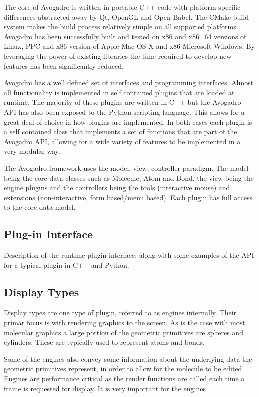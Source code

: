 \documentclass{article}
\begin{document}
The core of Avogadro is written in portable C++ code with platform specific differences abstracted away by Qt, OpenGL and Open Babel. The CMake build system makes the build process relatively simple on all supported platforms. Avogadro has been successfully built and tested on x86 and x86\_64 versions of Linux, PPC and x86 version of Apple Mac OS X and x86 Microsoft Windows. By leveraging the power of existing libraries the time required to develop new features has been significantly reduced.

Avogadro has a well defined set of interfaces and programming interfaces. Almost all functionality is implemented in self contained plugins that are loaded at runtime. The majority of these plugins are written in C++ but the Avogadro API has also been exposed to the Python scripting language. This allows for a great deal of choice in how plugins are implemented. In both cases each plugin is a self contained class that implements a set of functions that are part of the Avogadro API, allowing for a wide variety of features to be implemented in a very modular way.

The Avogadro framework uses the model, view, controller paradigm. The model being the core data classes such as Molecule, Atom and Bond, the view being the engine plugins and the controllers being the tools (interactive mouse) and extensions (non-interactive, form based/menu based). Each plugin has full access to the core data model.

\subsection{Plug-in Interface}

Description of the runtime plugin interface, along with some examples of the API for a typical plugin in C++ and Python.

\subsection{Display Types}

Display types are one type of plugin, referred to as engines internally. Their primar focus is with rendering graphics to the screen. As is the case with most molecular graphics a large portion of the geometric primitives are spheres and cylinders. These are typically used to represent atoms and bonds.

Some of the engines also convey some information about the underlying data the geometric primitives represent, in order to allow for the molecule to be edited. Engines are performance critical as the render functions are called each time a frame is requested for display. It is very important for the engines
\end{document}

